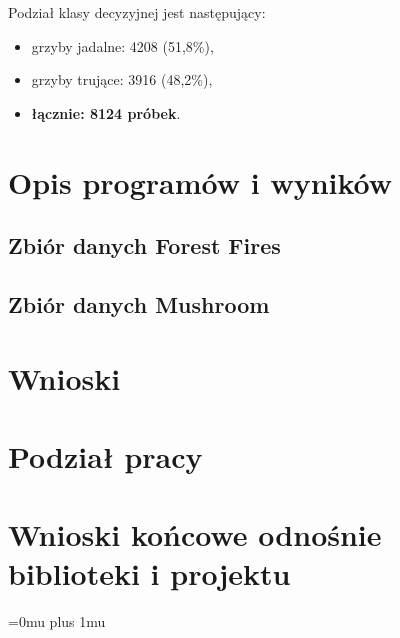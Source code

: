 \documentclass[10pt,a4paper]{article}
\begin{document}
Podział klasy decyzyjnej jest następujący:
\begin{itemize}[label=-]
	\item grzyby jadalne: 4208 (51,8\%),
	\item grzyby trujące: 3916 (48,2\%),
	\item \textbf{łącznie: 8124 próbek}.
\end{itemize}
\section{Opis programów i wyników}
\subsection{Zbiór danych Forest Fires}
\setcounter{page}{15}

\subsection{Zbiór danych Mushroom}
\setcounter{page}{27}


\section{Wnioski}

\section{Podział pracy}

\section{Wnioski końcowe odnośnie biblioteki i projektu}

\Urlmuskip=0mu plus 1mu\relax
{}

\end{document}
